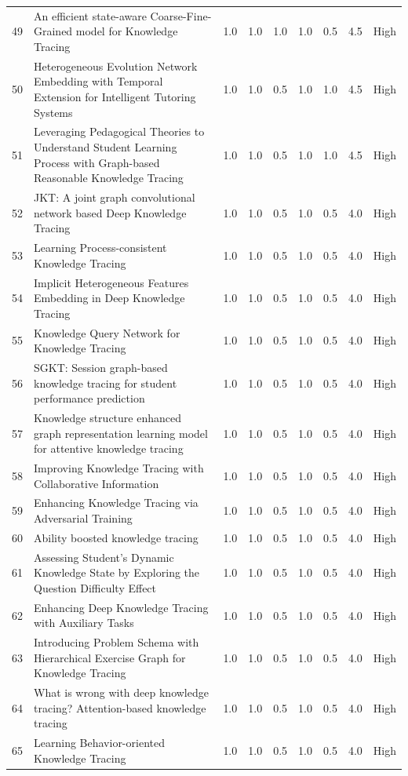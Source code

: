 \documentclass{article}
\begin{document}
\begin{longtable}{p{1cm}p{8cm}p{1cm}p{1cm}p{1cm}p{1cm}p{1cm}p{1.5cm}p{1.5cm}}
49 & An efficient state-aware Coarse-Fine-Grained model for Knowledge Tracing & 1.0 & 1.0 & 1.0 & 1.0 & 0.5 & 4.5 & High \\
50 & Heterogeneous Evolution Network Embedding with Temporal Extension for Intelligent Tutoring Systems & 1.0 & 1.0 & 0.5 & 1.0 & 1.0 & 4.5 & High \\
51 & Leveraging Pedagogical Theories to Understand Student Learning Process with Graph-based Reasonable Knowledge Tracing & 1.0 & 1.0 & 0.5 & 1.0 & 1.0 & 4.5 & High \\
52 & JKT: A joint graph convolutional network based Deep Knowledge Tracing & 1.0 & 1.0 & 0.5 & 1.0 & 0.5 & 4.0 & High \\
53 & Learning Process-consistent Knowledge Tracing & 1.0 & 1.0 & 0.5 & 1.0 & 0.5 & 4.0 & High \\
54 & Implicit Heterogeneous Features Embedding in Deep Knowledge Tracing & 1.0 & 1.0 & 0.5 & 1.0 & 0.5 & 4.0 & High \\
55 & Knowledge Query Network for Knowledge Tracing & 1.0 & 1.0 & 0.5 & 1.0 & 0.5 & 4.0 & High \\
56 & SGKT: Session graph-based knowledge tracing for student performance prediction & 1.0 & 1.0 & 0.5 & 1.0 & 0.5 & 4.0 & High \\
57 & Knowledge structure enhanced graph representation learning model for attentive knowledge tracing & 1.0 & 1.0 & 0.5 & 1.0 & 0.5 & 4.0 & High \\
58 & Improving Knowledge Tracing with Collaborative Information & 1.0 & 1.0 & 0.5 & 1.0 & 0.5 & 4.0 & High \\
59 & Enhancing Knowledge Tracing via Adversarial Training & 1.0 & 1.0 & 0.5 & 1.0 & 0.5 & 4.0 & High \\
60 & Ability boosted knowledge tracing & 1.0 & 1.0 & 0.5 & 1.0 & 0.5 & 4.0 & High \\
61 & Assessing Student's Dynamic Knowledge State by Exploring the Question Difficulty Effect & 1.0 & 1.0 & 0.5 & 1.0 & 0.5 & 4.0 & High \\
62 & Enhancing Deep Knowledge Tracing with Auxiliary Tasks & 1.0 & 1.0 & 0.5 & 1.0 & 0.5 & 4.0 & High \\
63 & Introducing Problem Schema with Hierarchical Exercise Graph for Knowledge Tracing & 1.0 & 1.0 & 0.5 & 1.0 & 0.5 & 4.0 & High \\
64 & What is wrong with deep knowledge tracing? Attention-based knowledge tracing & 1.0 & 1.0 & 0.5 & 1.0 & 0.5 & 4.0 & High \\
65 & Learning Behavior-oriented Knowledge Tracing & 1.0 & 1.0 & 0.5 & 1.0 & 0.5 & 4.0 & High \\

\end{longtable}
\end{document}
